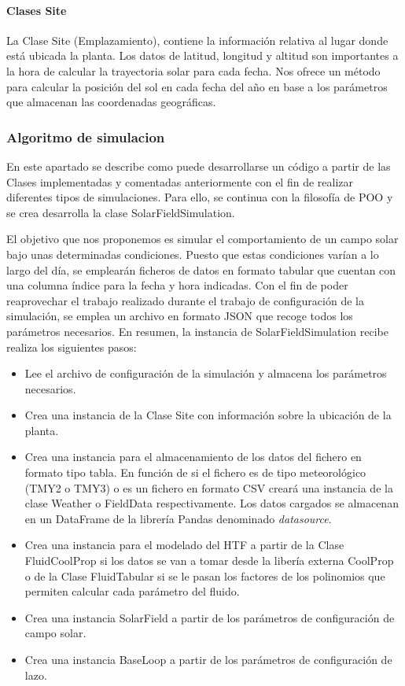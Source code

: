 \documentclass[11pt]{article}
\providecommand{\tightlist}{%
      \setlength{\itemsep}{0pt}\setlength{\parskip}{0pt}}
\begin{document}
\hypertarget{clases-site}{%
\paragraph{Clases Site}\label{clases-site}}

La Clase Site (Emplazamiento), contiene la información relativa al lugar
donde está ubicada la planta. Los datos de latitud, longitud y altitud
son importantes a la hora de calcular la trayectoria solar para cada
fecha. Nos ofrece un método para calcular la posición del sol en cada
fecha del año en base a los parámetros que almacenan las coordenadas
geográficas.

\hypertarget{algoritmo-de-simulacion}{%
\subsubsection{Algoritmo de simulacion}\label{algoritmo-de-simulacion}}

En este apartado se describe como puede desarrollarse un código a partir
de las Clases implementadas y comentadas anteriormente con el fin de
realizar diferentes tipos de simulaciones. Para ello, se continua con la
filosofía de POO y se crea desarrolla la clase SolarFieldSimulation.

El objetivo que nos proponemos es simular el comportamiento de un campo
solar bajo unas determinadas condiciones. Puesto que estas condiciones
varían a lo largo del día, se emplearán ficheros de datos en formato
tabular que cuentan con una columna índice para la fecha y hora
indicadas. Con el fin de poder reaprovechar el trabajo realizado durante
el trabajo de configuración de la simulación, se emplea un archivo en
formato JSON que recoge todos los parámetros necesarios. En resumen, la
instancia de SolarFieldSimulation recibe realiza los siguientes pasos:

\begin{itemize}
\tightlist
\item
  Lee el archivo de configuración de la simulación y almacena los
  parámetros necesarios.
\item
  Crea una instancia de la Clase Site con información sobre la ubicación
  de la planta.
\item
  Crea una instancia para el almacenamiento de los datos del fichero en
  formato tipo tabla. En función de si el fichero es de tipo
  meteorológico (TMY2 o TMY3) o es un fichero en formato CSV creará una
  instancia de la clase Weather o FieldData respectivamente. Los datos
  cargados se almacenan en un DataFrame de la librería Pandas denominado
  \emph{datasource}.
\item
  Crea una instancia para el modelado del HTF a partir de la Clase
  FluidCoolProp si los datos se van a tomar desde la libería externa
  CoolProp o de la Clase FluidTabular si se le pasan los factores de los
  polinomios que permiten calcular cada parámetro del fluido.
\item
  Crea una instancia SolarField a partir de los parámetros de
  configuración de campo solar.
\item
  Crea una instancia BaseLoop a partir de los parámetros de
  configuración de lazo.
\end{itemize}
\end{document}

